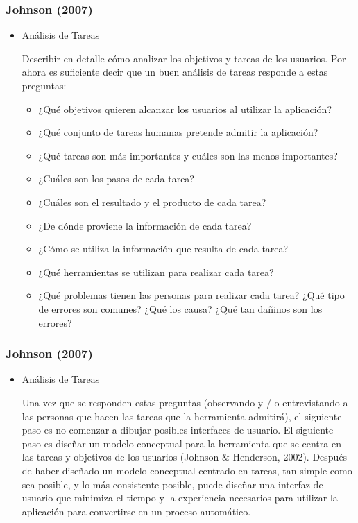 \documentclass[11pt]{beamer}
\begin{document}
\begin{frame}
\frametitle{Johnson (2007)}
\begin{itemize}
\color{red}
\item Análisis de Tareas
    \par
    \justify
    \color{black}
    Describir en detalle cómo analizar los objetivos y tareas de los usuarios. Por ahora es suficiente decir que un buen análisis de tareas responde a estas preguntas:
    \begin{itemize}
    \item ¿Qué objetivos quieren alcanzar los usuarios al utilizar la aplicación?
    \item ¿Qué conjunto de tareas humanas pretende admitir la aplicación?
    \item ¿Qué tareas son más importantes y cuáles son las menos importantes?
    \item ¿Cuáles son los pasos de cada tarea?
    \item ¿Cuáles son el resultado y el producto de cada tarea?
    \item ¿De dónde proviene la información de cada tarea?
    \item ¿Cómo se utiliza la información que resulta de cada tarea?
    \item ¿Qué herramientas se utilizan para realizar cada tarea?
    \item ¿Qué problemas tienen las personas para realizar cada tarea? ¿Qué tipo de errores son comunes? ¿Qué los causa? ¿Qué tan dañinos son los errores?
    \end{itemize}
\end{itemize}
\end{frame}

\begin{frame}
\frametitle{Johnson (2007)}
\begin{itemize}
\color{red}
\item Análisis de Tareas
    \par
    \justify
    \color{black}
    Una vez que se responden estas preguntas (observando y / o entrevistando a las personas que hacen las tareas que la herramienta admitirá), el siguiente paso es no comenzar a dibujar posibles interfaces de usuario. El siguiente paso es diseñar un modelo conceptual para la herramienta que se centra en las tareas y objetivos de los usuarios (Johnson & Henderson, 2002). Después de haber diseñado un modelo conceptual centrado en tareas, tan simple como sea posible, y lo más consistente posible, puede diseñar una interfaz de usuario que minimiza el tiempo y la experiencia necesarios para utilizar la aplicación para convertirse en un proceso automático.
    \end{itemize}
    
\end{frame}
\end{document}
